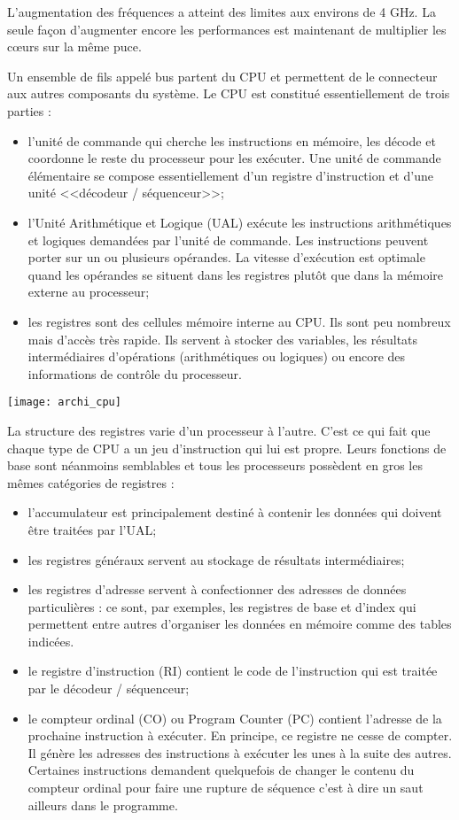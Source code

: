 L'augmentation des fréquences a atteint des limites aux environs de 4 GHz. La seule façon
d'augmenter encore les performances est maintenant de multiplier les cœurs sur la même
puce.


Un ensemble de fils appelé bus partent du CPU et permettent de le connecteur aux autres composants du système.
Le CPU est constitué essentiellement de trois parties :
\begin{itemize}
\item l'unité de commande qui cherche les instructions en mémoire, les décode et coordonne le
reste du processeur pour les exécuter. Une unité de commande élémentaire se compose
essentiellement d'un registre d'instruction et d'une unité <<décodeur / séquenceur>>;
\item l'Unité Arithmétique et Logique (UAL) exécute les instructions arithmétiques et logiques
demandées par l'unité de commande. Les instructions peuvent porter sur un ou plusieurs
opérandes. La vitesse d'exécution est optimale quand les opérandes se situent dans les
registres plutôt que dans la mémoire externe au processeur;
\item les registres sont des cellules mémoire interne au CPU. Ils sont peu nombreux mais d'accès
très rapide. Ils servent à stocker des variables, les résultats intermédiaires d'opérations
(arithmétiques ou logiques) ou encore des informations de contrôle du processeur.

\end{itemize}


\begin{center}
\texttt{[image: archi\_cpu]}
\end{center}

La structure des registres varie d'un processeur à l'autre. C'est ce qui fait que chaque type de CPU a un jeu d'instruction qui lui est propre. Leurs fonctions de base sont néanmoins
semblables et tous les processeurs possèdent en gros les mêmes catégories de registres :
\begin{itemize}
\item l'accumulateur est principalement destiné à contenir les données qui doivent être
traitées par l'UAL;
\item les registres généraux servent au stockage de résultats intermédiaires;
\item les registres d’adresse servent à confectionner des adresses de données
particulières : ce sont, par exemples, les registres de base et d'index qui permettent
entre autres d'organiser les données en mémoire comme des tables indicées.
\item le registre d'instruction (RI) contient le code de l'instruction qui est traitée par le
décodeur / séquenceur;
\item le compteur ordinal (CO) ou Program Counter (PC) contient l'adresse de la
prochaine instruction à exécuter. En principe, ce registre ne cesse de compter. Il
génère les adresses des instructions à exécuter les unes à la suite des autres.
Certaines instructions demandent quelquefois de changer le contenu du compteur
ordinal pour faire une rupture de séquence c'est à dire un saut ailleurs dans le
programme.
\end{itemize}


